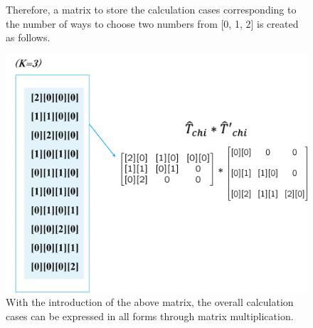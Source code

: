 \documentclass{article}[12pt]
\numberwithin{equation}{section}
\begin{document}
\begin{spacing}{1.5}
\begin{figure}[H]
  \caption{Therefore, a matrix to store the calculation cases corresponding to the number of ways to choose two numbers from [0, 1, 2] is created as follows.}
\end{figure}
\begin{figure}[H]
  \centerline{\includegraphics[width=14cm]{TexFigure/Tmat3.png}}
  \caption{With the introduction of the above matrix, the overall calculation cases can be expressed in all forms through matrix multiplication.}
\end{figure}

\pagebreak

\end{spacing}
\end{document}
